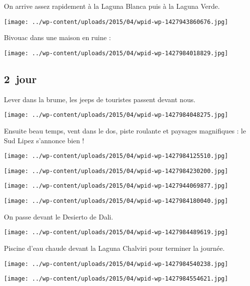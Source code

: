  On arrive assez rapidement à la Laguna Blanca puis à la Laguna Verde.
\begin{center} \texttt{[image: ../wp-content/uploads/2015/04/wpid-wp-1427943860676.jpg]} \end{center}

\pagebreak
 Bivouac dans une maison en ruine :
\begin{center} \texttt{[image: ../wp-content/uploads/2015/04/wpid-wp-1427984018829.jpg]} \end{center}

\subsection*{2\ieme\ jour} 
 Lever dans la brume, les jeeps de touristes passent devant nous.
\begin{center} \texttt{[image: ../wp-content/uploads/2015/04/wpid-wp-1427984048275.jpg]} \end{center}

\pagebreak
 Ensuite beau temps, vent dans le dos, piste roulante et paysages magnifiques : le Sud Lipez s'annonce bien !
\begin{center} \texttt{[image: ../wp-content/uploads/2015/04/wpid-wp-1427984125510.jpg]} \end{center}
\begin{center} \texttt{[image: ../wp-content/uploads/2015/04/wpid-wp-1427984230200.jpg]} \end{center}
\begin{center} \texttt{[image: ../wp-content/uploads/2015/04/wpid-wp-1427944069877.jpg]} \end{center}
\begin{center} \texttt{[image: ../wp-content/uploads/2015/04/wpid-wp-1427984180040.jpg]} \end{center}

\pagebreak
 On passe devant le Desierto de Dali.
\begin{center} \texttt{[image: ../wp-content/uploads/2015/04/wpid-wp-1427984489619.jpg]} \end{center}

 Piscine d'eau chaude devant la Laguna Chalviri pour terminer la journée.
\begin{center} \texttt{[image: ../wp-content/uploads/2015/04/wpid-wp-1427984540238.jpg]} \end{center}
\begin{center} \texttt{[image: ../wp-content/uploads/2015/04/wpid-wp-1427984554621.jpg]} \end{center}

